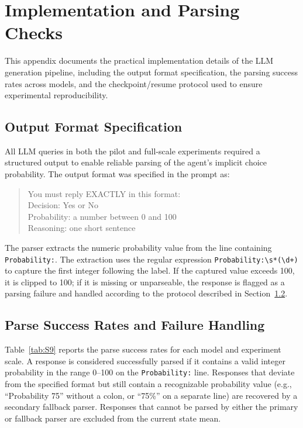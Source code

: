 \documentclass[11pt]{article}
\begin{document}
\section{Implementation and Parsing Checks}
\label{app:implementation}

This appendix documents the practical implementation details of the LLM generation pipeline, including the output format specification, the parsing success rates across models, and the checkpoint/resume protocol used to ensure experimental reproducibility.

\subsection{Output Format Specification}
\label{app:output_format}

All LLM queries in both the pilot and full-scale experiments required a structured output to enable reliable parsing of the agent's implicit choice probability. The output format was specified in the prompt as:

\begin{quote}\small
You must reply EXACTLY in this format:\\
Decision: Yes or No\\
Probability: a number between 0 and 100\\
Reasoning: one short sentence
\end{quote}

The parser extracts the numeric probability value from the line containing \texttt{Probability:}. The extraction uses the regular expression \texttt{Probability:\textbackslash s*(\textbackslash d+)} to capture the first integer following the label. If the captured value exceeds 100, it is clipped to 100; if it is missing or unparseable, the response is flagged as a parsing failure and handled according to the protocol described in Section~\ref{app:parse_handling}.

\subsection{Parse Success Rates and Failure Handling}
\label{app:parse_handling}

Table~\ref{tab:S9} reports the parse success rates for each model and experiment scale. A response is considered successfully parsed if it contains a valid integer probability in the range 0--100 on the \texttt{Probability:} line. Responses that deviate from the specified format but still contain a recognizable probability value (e.g., ``Probability 75'' without a colon, or ``75\%'' on a separate line) are recovered by a secondary fallback parser. Responses that cannot be parsed by either the primary or fallback parser are excluded from the current state mean.
\end{document}
